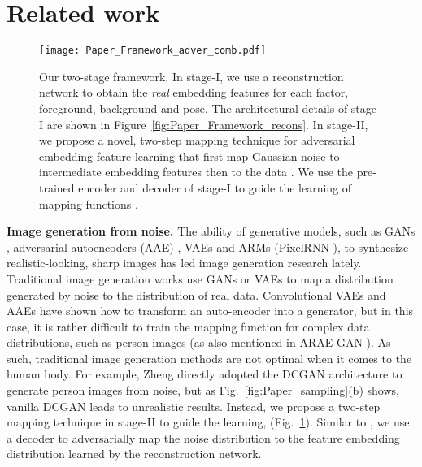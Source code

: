 \documentclass[10pt,twocolumn,letterpaper]{article}
\begin{document}
 \section{Related work}
\label{sec:related_work}

\begin{figure} \scriptsize
  \centering
  \texttt{[image: Paper\_Framework\_adver\_comb.pdf]}\\
\vspace{-2mm}
\caption{Our two-stage framework. In stage-\RN{1}, we use a reconstruction network to obtain the {\it real} embedding features  for each factor, \ie foreground, background and pose. The architectural details of stage-\RN{1} are shown in Figure~\ref{fig:Paper_Framework_recons}. In stage-\RN{2}, we propose a novel, two-step mapping technique for adversarial embedding feature learning that first map Gaussian noise  to intermediate embedding features  then to the data . We use the pre-trained encoder and decoder of stage-\RN{1} to guide the learning of mapping functions .}
\label{fig:Paper_Framework_adver_decoder}
\vspace{-3mm}
\end{figure}

\textbf{Image generation from noise.}
The ability of generative models, such as GANs \cite{GAN}, adversarial autoencoders (AAE) \cite{AAE}, VAEs \cite{VAE} and ARMs (\eg PixelRNN \cite{van2016pixel}), to synthesize realistic-looking, sharp images has led image generation research lately.
Traditional image generation works use GANs \cite{GAN} or VAEs \cite{VAE} to map a distribution generated by noise  to the distribution of real data. 
Convolutional VAEs and AAEs \cite{AAE} have shown how to transform an auto-encoder into a generator, but in this case, it is rather difficult to train the mapping function for complex data distributions, such as person images (as also mentioned in ARAE-GAN \cite{ARAE-GAN}).
As such, traditional image generation methods are not optimal when it comes to the human body.
For example, Zheng \etal \cite{GAN_reid} directly adopted the DCGAN architecture \cite{DCGAN} to generate person images from noise, but as Fig.~\ref{fig:Paper_sampling}(b) shows, vanilla DCGAN leads to unrealistic results. 
Instead, we propose a two-step mapping technique in stage-\RN{2} to guide the learning, \ie  (Fig.~\ref{fig:Paper_Framework_adver_decoder}).
Similar to \cite{ARAE-GAN}, we use a decoder to adversarially map the noise distribution to the feature embedding distribution learned by the reconstruction network.
\end{document}
